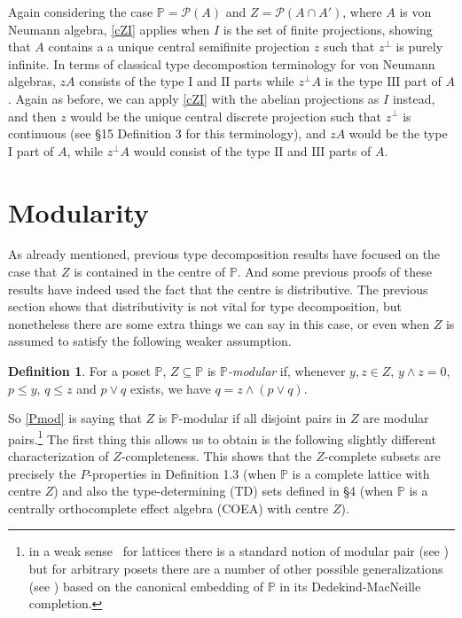 \documentclass{amsart}
\theoremstyle{definition}
\newtheorem{dfn}[dfn]{Definition}
\numberwithin{equation}{section}
\begin{document}
Again considering the case $\mathbb{P}=\mathcal{P}(A)$ and $Z=\mathcal{P}(A\cap A')$, where $A$ is von Neumann algebra, \autoref{cZI}  applies when $I$ is the set of finite projections, showing that $A$ contains a a unique central semifinite projection $z$ such that $z^\perp$ is purely infinite.  In terms of classical type decompostion terminology for von Neumann algebras, $zA$ consists of the type $\mathrm{I}$ and $\mathrm{II}$ parts while $z^\perp A$ is the type $\mathrm{III}$ part of $A$.  Again as before, we can apply \autoref{cZI} with the abelian projections as $I$ instead, and then $z$ would be the unique central discrete projection such that $z^\perp$ is continuous  (see \cite{Berberian1972} \S15 Definition 3 for this terminology), and $zA$ would be the type $\mathrm{I}$ part of $A$, while $z^\perp A$ would consist of the type $\mathrm{II}$ and $\mathrm{III}$ parts of $A$.















\section{Modularity}

As already mentioned, previous type decomposition results have focused on the case that $Z$ is contained in the centre of $\mathbb{P}$.  And some previous proofs of these results have indeed used the fact that the centre is distributive.  The previous section shows that distributivity is not vital for type decomposition, but nonetheless there are some extra things we can say in this case, or even when $Z$ is assumed to satisfy the following weaker assumption.

\begin{dfn}\label{Pmod}
For a poset $\mathbb{P}$, $Z\subseteq\mathbb{P}$ is \emph{$\mathbb{P}$-modular} if, whenever $y,z\in Z$, $y\wedge z=0$, $p\leq y$, $q\leq z$ and $p\vee q$ exists, we have $q=z\wedge(p\vee q)$.
\end{dfn}
So \autoref{Pmod} is saying that $Z$ is $\mathbb{P}$-modular if all disjoint pairs in $Z$ are modular pairs.\footnote{in a weak sense \textendash\, for lattices there is a standard notion of modular pair (see \cite{MaedaMaeda1970}) but for arbitrary posets there are a number of other possible generalizations (see \cite{ThakarePawarWaphare2004}) based on the canonical embedding of $\mathbb{P}$ in its Dedekind-MacNeille completion.}  The first thing this allows us to obtain is the following slightly different characterization of $Z$-completeness.  This shows that the $Z$-complete subsets are precisely the $P$-properties in \cite{MaedaF1959} Definition 1.3 (when $\mathbb{P}$ is a complete lattice with centre $Z$) and also the type-determining (TD) sets defined in \cite{FoulisPulmannova2010} \S4 (when $\mathbb{P}$ is a centrally orthocomplete effect algebra (COEA) with centre $Z$).
\end{document}
